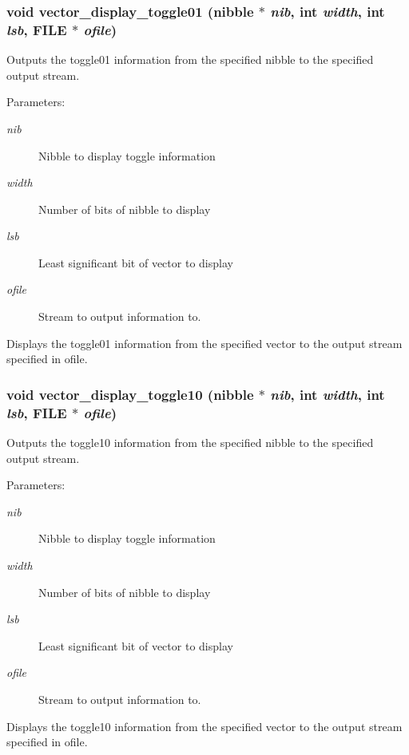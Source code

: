 \subsubsection{\setlength{\rightskip}{0pt plus 5cm}void vector\_\-display\_\-toggle01 ({\bf nibble} $\ast$ {\em nib}, int {\em width}, int {\em lsb}, FILE $\ast$ {\em ofile})}\label{vector_8h_a6}


Outputs the toggle01 information from the specified nibble to the specified output stream.

\begin{Desc}
\item[Parameters: ]\par
\begin{description}
\item[{\em 
nib}]Nibble to display toggle information \item[{\em 
width}]Number of bits of nibble to display \item[{\em 
lsb}]Least significant bit of vector to display \item[{\em 
ofile}]Stream to output information to.\end{description}
\end{Desc}
Displays the toggle01 information from the specified vector to the output stream specified in ofile. 
\subsubsection{\setlength{\rightskip}{0pt plus 5cm}void vector\_\-display\_\-toggle10 ({\bf nibble} $\ast$ {\em nib}, int {\em width}, int {\em lsb}, FILE $\ast$ {\em ofile})}\label{vector_8h_a7}


Outputs the toggle10 information from the specified nibble to the specified output stream.

\begin{Desc}
\item[Parameters: ]\par
\begin{description}
\item[{\em 
nib}]Nibble to display toggle information \item[{\em 
width}]Number of bits of nibble to display \item[{\em 
lsb}]Least significant bit of vector to display \item[{\em 
ofile}]Stream to output information to.\end{description}
\end{Desc}
Displays the toggle10 information from the specified vector to the output stream specified in ofile. 
